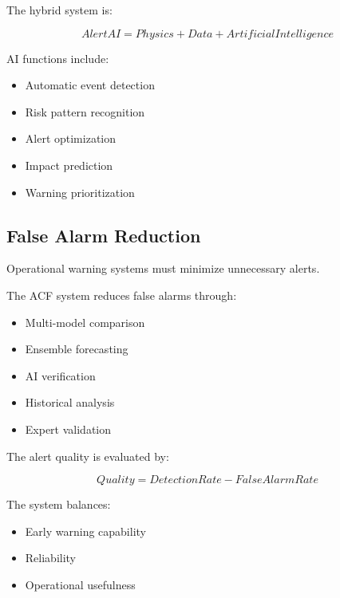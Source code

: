 The hybrid system is:

\[
AlertAI=
Physics
+
Data
+
ArtificialIntelligence
\]


AI functions include:

\begin{itemize}

\item Automatic event detection

\item Risk pattern recognition

\item Alert optimization

\item Impact prediction

\item Warning prioritization

\end{itemize}



\subsection{False Alarm Reduction}

Operational warning systems must minimize unnecessary alerts.

The ACF system reduces false alarms through:

\begin{itemize}

\item Multi-model comparison

\item Ensemble forecasting

\item AI verification

\item Historical analysis

\item Expert validation

\end{itemize}


The alert quality is evaluated by:

\[
Quality=
DetectionRate
-
FalseAlarmRate
\]


The system balances:

\begin{itemize}

\item Early warning capability

\item Reliability

\item Operational usefulness

\end{itemize}


